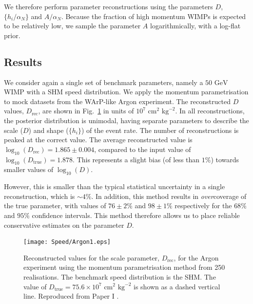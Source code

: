 We therefore perform parameter reconstructions using the parameters \(D\), \(\{h_i/\alpha_N\}\) and \(A/\alpha_N\). Because the fraction of high momentum WIMPs is expected to be relatively low, we sample the parameter \(A\) logarithmically, with a log-flat prior.

\subsection{Results}

We consider again a single set of benchmark parameters, namely a \(50 \textrm{ GeV}\) WIMP with a SHM speed distribution. We apply the momentum parametrisation to mock datasets from the WArP-like Argon experiment. The reconstructed \(D\) values, \(D_\textrm{rec}\),  are shown in Fig.\ \ref{fig:Speed:Argon1} in units of \(10^7 \textrm{ cm}^2 \textrm{ kg}^{-2}\). In all reconstructions, the posterior distribution is unimodal, having separate parameters to describe the scale (\(D\)) and shape (\(\{h_i\}\)) of the event rate. The number of reconstructions is peaked at the correct value. The average reconstructed value is \(\log_{10}(D_\textrm{rec}) = 1.865 \pm 0.004\), compared to the input value of \(\log_{10}(D_\textrm{true}) = 1.878\). This represents a slight bias (of less than \(1\%\)) towards smaller values of \(\log_{10}(D)\).

However, this is smaller than the typical statistical uncertainty in a single reconstruction, which is \(\sim 4\%\). In addition, this method results in \textit{over}coverage of the true parameter, with values of \(76 \pm 2 \%\) and \(98 \pm 1\%\) respectively for the \(68\%\) and \(95\%\) confidence intervals. This method therefore allows us to place reliable conservative estimates on the parameter \(D\).

\begin{figure}[t]
\centering
  \texttt{[image: Speed/Argon1.eps]}
  \caption[Distribution of the reconstructed scale parameter, $D_\textrm{rec}$, for the Argon experiment using the momentum parametrisation]{Reconstructed values for the scale parameter, \(D_\textrm{rec}\), for the Argon experiment using the momentum parametrisation method from 250 realisations. The benchmark speed distribution is the SHM. The value of \(D_\textrm{true} = 75.6 \times 10^7 \textrm{ cm}^2 \textrm{ kg}^{-2}\) is shown as a dashed vertical line. Reproduced from Paper I \cite{Kavanagh:2012}.}
   \label{fig:Speed:Argon1}
\end{figure}

